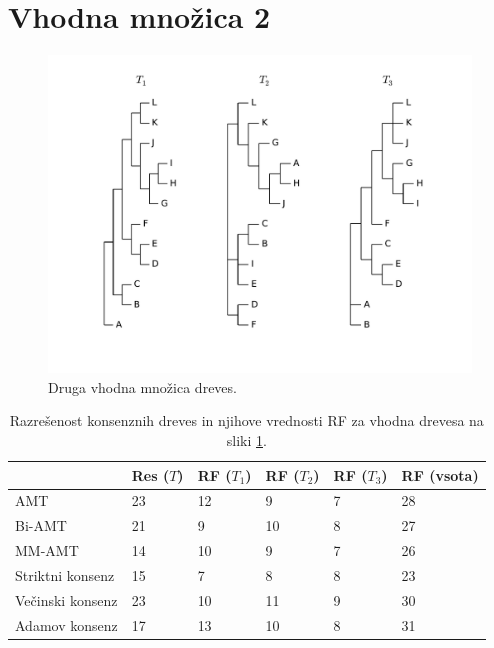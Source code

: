 \documentclass[a4paper, 12pt]{book}
\begin{document}
\section{Vhodna množica 2}
\begin{figure}[h!]
	\begin{center}
		\includegraphics[scale=0.50, clip=true, trim=1cm 2cm 1cm 0]{gfx/eval_input_2.pdf}
	\end{center}
	\caption{Druga vhodna množica dreves.}
	\label{img-eval-input-2}
\end{figure}

\begin{table}[h!]
	\begin{center}
	{\footnotesize
	\begin{tabular}{ l| l | l | l | l | l }
	~                & Res ($T$) & RF ($T_1$) & RF ($T_2$) & RF ($T_3$) & RF (vsota) \\ \hline
	AMT              & 23          & 12            & 9             & 7             & 28         \\ \hline
	Bi-AMT           & 21          & 9             & 10            & 8             & 27         \\ \hline
	MM-AMT           & 14          & 10            & 9             & 7             & 26         \\ \hline
	Striktni konsenz & 15          & 7             & 8             & 8             & 23         \\ \hline
	Večinski konsenz & 23          & 10            & 11            & 9             & 30         \\ \hline
	Adamov konsenz   & 17          & 13            & 10            & 8             & 31         \\ \hline
	\end{tabular}
	\caption{\label{table-eval-2}Razrešenost konsenznih dreves in njihove vrednosti RF za vhodna drevesa na sliki \ref{img-eval-input-2}.}
	}
	\end{center}		
\end{table}
\end{document}
